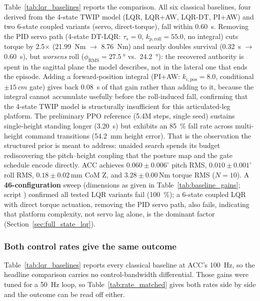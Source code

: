 \documentclass[a4paper,fleqn]{cas-dc}
\begin{document}
Table~\ref{tab:lqr_baselines} reports the comparison.
All six classical baselines, four derived from the 4-state TWIP model (LQR, LQR+AW, LQR-DT, PI+AW) and two 6-state coupled variants (servo, direct-torque), fall within \SI{0.60}{s}. Removing the PID servo path (4-state DT-LQR: $\tau_s{=}0$, $k_{p,\text{roll}}{=}55.0$, no integral) cuts torque by \num{2.5}$\times$ (\SI{21.99}{Nm} $\rightarrow$ \SI{8.76}{Nm}) and nearly doubles survival (\SI{0.32}{s} $\rightarrow$ \SI{0.60}{s}), but \emph{worsens} roll ($\phi_{\text{RMS}}{=}\SI{27.5}{\degree}$ vs.\ \SI{24.2}{\degree}): the recovered authority is spent in the sagittal plane the model describes, not in the lateral one that ends the episode. Adding a forward-position integral (PI+AW: $k_{i,\text{pos}}{=}8.0$, conditional $\pm\SI{15}{cm}$ gate) gives back \SI{0.08}{s} of that gain rather than adding to it, because the integral cannot accumulate usefully before the roll-induced fall, confirming that the 4-state TWIP model is structurally insufficient for this articulated-leg platform.
The preliminary PPO reference (5.4M steps, single seed) sustains single-height standing longer (\SI{3.20}{s}) but exhibits an \SI{85}{\percent} fall rate across multi-height command transitions (\SI{54.2}{mm} height error). That is the observation the structured prior is meant to address: unaided search spends its budget rediscovering the pitch--height coupling that the posture map and the gate schedule encode directly.
ACC achieves $0.060{\pm}0.006^\circ$ pitch RMS, $0.010{\pm}0.001^\circ$ roll RMS, $0.18{\pm}0.02$\,mm CoM Z, and $3.28{\pm}0.00$\,Nm torque RMS ($N{=}10$).
A \textbf{46-configuration} sweep (dimensions as given in Table~\ref{tab:baseline_gains}; script ) confirmed all tested LQR variants fail (\SI{100}{\percent}); a 6-state coupled LQR with direct torque actuation, removing the PID servo path, also fails, indicating that platform complexity, not servo lag alone, is the dominant factor (Section~\ref{sec:full_state_lqr}).

\subsubsection{Both control rates give the same outcome}
\label{sec:rate_matched}

Table~\ref{tab:lqr_baselines} reports every classical baseline at ACC's \SI{100}{Hz}, so the headline comparison carries no control-bandwidth differential. Those gains were tuned for a \SI{50}{Hz} loop, so Table~\ref{tab:rate_matched} gives both rates side by side and the outcome can be read off either.
\end{document}
